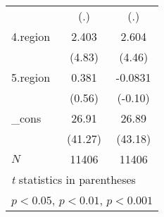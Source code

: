 {\begin{tabular}{l*{2}{c}}
            &         (.)         &         (.)         \\
[1em]
4.region    &       2.403\sym{***}&       2.604\sym{***}\\
            &      (4.83)         &      (4.46)         \\
[1em]
5.region    &       0.381         &     -0.0831         \\
            &      (0.56)         &     (-0.10)         \\
[1em]
\_cons      &       26.91\sym{***}&       26.89\sym{***}\\
            &     (41.27)         &     (43.18)         \\
\hline
\(N\)       &       11406         &       11406         \\
\hline\hline
\multicolumn{3}{l}{\footnotesize \textit{t} statistics in parentheses}\\
\multicolumn{3}{l}{\footnotesize \sym{*} \(p<0.05\), \sym{**} \(p<0.01\), \sym{***} \(p<0.001\)}\\
\end{tabular}
}
